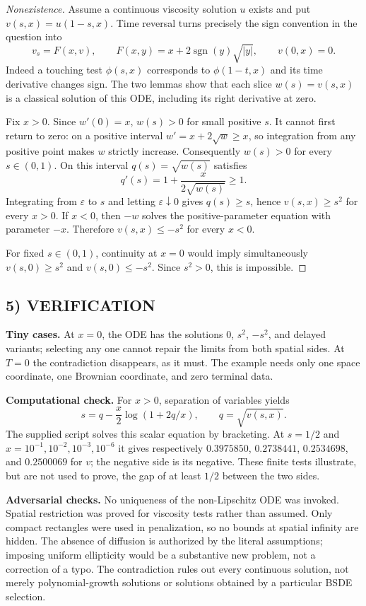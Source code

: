 \documentclass[11pt,a4paper]{article}
\newcommand{\sgn}{\operatorname{sgn}}
\theoremstyle{definition}
\begin{document}
\begin{proof}[Nonexistence]
Assume a continuous viscosity solution $u$ exists and put $v(s,x)=u(1-s,x)$. Time reversal turns precisely the sign convention in the question into
\[
 v_s=F(x,v),\qquad F(x,y)=x+2\sgn(y)\sqrt{|y|},\qquad v(0,x)=0.
\]
Indeed a touching test $\phi(s,x)$ corresponds to $\phi(1-t,x)$ and its time derivative changes sign. The two lemmas show that each slice $w(s)=v(s,x)$ is a classical solution of this ODE, including its right derivative at zero.

Fix $x>0$. Since $w'(0)=x$, $w(s)>0$ for small positive $s$. It cannot first return to zero: on a positive interval $w'=x+2\sqrt w\ge x$, so integration from any positive point makes $w$ strictly increase. Consequently $w(s)>0$ for every $s\in(0,1)$. On this interval $q(s)=\sqrt{w(s)}$ satisfies
\[
 q'(s)=1+\frac{x}{2\sqrt{w(s)}}\ge1.
\]
Integrating from $\varepsilon$ to $s$ and letting $\varepsilon\downarrow0$ gives $q(s)\ge s$, hence $v(s,x)\ge s^2$ for every $x>0$. If $x<0$, then $-w$ solves the positive-parameter equation with parameter $-x$. Therefore $v(s,x)\le-s^2$ for every $x<0$.

For fixed $s\in(0,1)$, continuity at $x=0$ would imply simultaneously
$v(s,0)\ge s^2$ and $v(s,0)\le-s^2$. Since $s^2>0$, this is impossible.
\end{proof}

\subsection*{5) VERIFICATION}
\textbf{Tiny cases.} At $x=0$, the ODE has the solutions $0$, $s^2$, $-s^2$, and delayed variants; selecting any one cannot repair the limits from both spatial sides. At $T=0$ the contradiction disappears, as it must. The example needs only one space coordinate, one Brownian coordinate, and zero terminal data.

\textbf{Computational check.} For $x>0$, separation of variables yields
\[
 s=q-\frac{x}{2}\log(1+2q/x),\qquad q=\sqrt{v(s,x)}.
\]
The supplied script solves this scalar equation by bracketing. At $s=1/2$ and $x=10^{-1},10^{-2},10^{-3},10^{-6}$ it gives respectively
$0.3975850$, $0.2738441$, $0.2534698$, and $0.2500069$ for $v$; the negative side is its negative. These finite tests illustrate, but are not used to prove, the gap of at least $1/2$ between the two sides.

\textbf{Adversarial checks.} No uniqueness of the non-Lipschitz ODE was invoked. Spatial restriction was proved for viscosity tests rather than assumed. Only compact rectangles were used in penalization, so no bounds at spatial infinity are hidden. The absence of diffusion is authorized by the literal assumptions; imposing uniform ellipticity would be a substantive new problem, not a correction of a typo. The contradiction rules out every continuous solution, not merely polynomial-growth solutions or solutions obtained by a particular BSDE selection.
\end{document}
